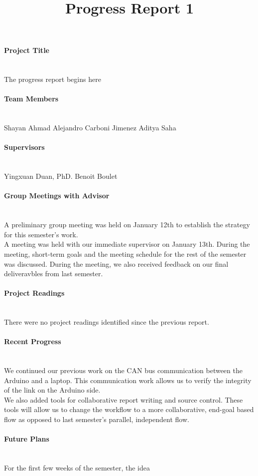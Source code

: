 \documentclass[12pt]{article}
\begin{document}
\title{Progress Report 1}
\date{}
\maketitle
\paragraph{Project Title} \\
The progress report begins here

\paragraph{Team Members} \\
Shayan Ahmad 
Alejandro Carboni Jimenez
Aditya Saha

\paragraph{Supervisors}\\
Yingxuan Duan, PhD.
Benoit Boulet

\paragraph{Group Meetings with Advisor}\\
A preliminary group meeting was held on January 12th to establish the
strategy for this semester's work. \\
A meeting was held with our immediate supervisor on January 13th. During the
meeting, short-term goals and the meeting schedule for the rest of the semester
was discussed. During the meeting, we also received feedback on our final 
deliveravbles from last semester. 

\paragraph{Project Readings}\\
There were no project readings identified since the previous report.

\paragraph{Recent Progress}\\
We continued our previous work on the CAN bus communication between the Arduino
and a laptop. This communication work allows us to verify the integrity of the 
link on the Arduino side.\\

We also added tools for collaborative report writing and source control. These
tools will allow us to change the workflow to a more collaborative, end-goal 
based flow as opposed to last semester's parallel, independent flow.

\paragraph{Future Plans}\\
For the first few weeks of the semester, the idea 
\end{document}
